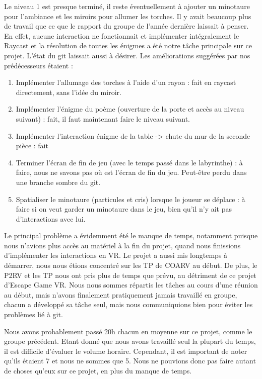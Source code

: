 \documentclass[12pt]{article}
\begin{document}
Le niveau 1 est presque terminé, il reste éventuellement à ajouter un minotaure pour l’ambiance et les miroirs pour allumer les torches. Il y avait beaucoup plus de travail que ce que le rapport du groupe de l’année dernière laissait à penser. En effet, aucune interaction ne fonctionnait et implémenter intégralement le Raycast et la résolution de toutes les énigmes a été notre tâche principale sur ce projet. L'état du git laissait aussi à désirer. Les améliorations suggérées par nos prédécesseurs étaient :

\begin{enumerate}
    \item Implémenter l'allumage des torches à l'aide d'un rayon : fait en raycast directement, sans l'idée du miroir.
    \item Implémenter l'énigme du poème (ouverture de la porte et accès au niveau suivant) : fait, il faut maintenant faire le niveau suivant.
    \item Implémenter l’interaction énigme de la table -> chute du mur de la seconde pièce : fait
    \item Terminer l’écran de fin de jeu (avec le temps passé dans le labyrinthe) : à faire, nous ne savons pas où est l’écran de fin du jeu. Peut-être perdu dans une branche sombre du git.
    \item Spatialiser le minotaure (particules et cris) lorsque le joueur se déplace : à faire si on veut garder un minotaure dans le jeu, bien qu’il n’y ait pas d’interactions avec lui.
\end{enumerate}

Le principal problème a évidemment été le manque de temps, notamment puisque nous n’avions plus accès au matériel à la fin du projet, quand nous finissions d’implémenter les interactions en VR. Le projet a aussi mis longtemps à démarrer, nous nous étions concentré sur les TP de COARV au début. De plus, le P2RV et les TP nous ont pris plus de temps que prévu, au détriment de ce projet d’Escape Game VR. Nous nous sommes répartis les tâches au cours d’une réunion au début, mais n’avons finalement pratiquement jamais travaillé en groupe, chacun a développé sa tâche seul, mais nous communiquions bien pour éviter les problèmes lié à git.

Nous avons probablement passé 20h chacun en moyenne sur ce projet, comme le groupe précédent. Etant donné que nous avons travaillé seul la plupart du temps, il est difficile d’évaluer le volume horaire. Cependant, il est important de noter qu’ils étaient 7 et nous ne sommes que 5. Nous ne pouvions donc pas faire autant de choses qu’eux sur ce projet, en plus du manque de temps.
\end{document}
